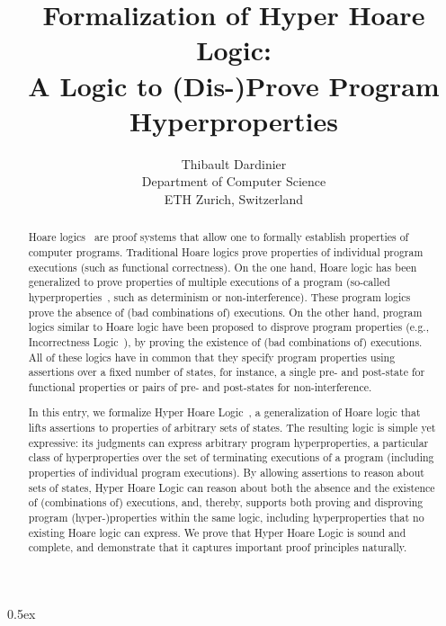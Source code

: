 \documentclass[11pt,a4paper]{article}
\begin{document}
\title{Formalization of Hyper Hoare Logic:\\A Logic to (Dis-)Prove Program Hyperproperties}
\author{Thibault Dardinier\\
Department of Computer Science\\ETH Zurich, Switzerland}

\maketitle

\begin{abstract}
	Hoare logics~\cite{FloydLogic, HoareLogic} are proof systems that allow one to formally establish properties of computer programs.
	Traditional Hoare logics prove properties of individual program executions (such as functional correctness).
	On the one hand, Hoare logic has been generalized to prove properties of multiple executions of a program (so-called hyperproperties~\cite{hyperproperties}, such as determinism or non-interference).
	These program logics prove the absence of (bad combinations of) executions.
	On the other hand, program logics similar to Hoare logic have been proposed to disprove program properties (e.g., Incorrectness Logic~\cite{IncorrectnessLogic}), by proving the existence of (bad combinations of) executions.
	All of these logics have in common that they specify program properties using assertions over a fixed number of states, for instance, a single pre- and post-state for functional properties or pairs of pre- and post-states for non-interference.

	In this entry, we formalize Hyper Hoare Logic~\cite{HyperHoareLogic,HyperHoareLogicPLDI}, a generalization of Hoare logic that lifts assertions to properties of arbitrary sets of states.
	The resulting logic is simple yet expressive: its judgments can express arbitrary program hyperproperties, a particular class of hyperproperties over the set of terminating executions of a program (including properties of individual program executions).
	By allowing assertions to reason about sets of states, Hyper Hoare Logic can reason about both the absence and the existence of (combinations of) executions, and, thereby, supports both proving and disproving program (hyper-)properties within the same logic, including hyperproperties that no existing Hoare logic can express.
	We prove that Hyper Hoare Logic is sound and complete, and demonstrate that it captures important proof principles naturally.
\end{abstract}

\clearpage

\tableofcontents

\parindent 0pt\parskip 0.5ex




%
%

\end{document}
